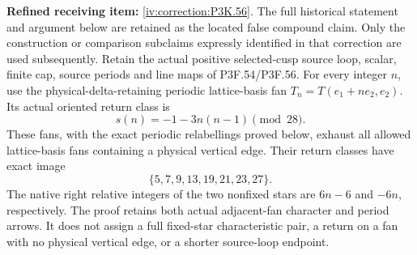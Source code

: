 \begin{theorem}\hypertarget{tag-02V2}{}\label{night:P3K.56}

\par\noindent\textbf{Refined receiving item:} \cref{iv:correction:P3K.56}. The full historical statement and argument below are retained as the located false compound claim. Only the construction or comparison subclaims expressly identified in that correction are used subsequently.
Retain the actual positive selected-cusp source loop, scalar, finite
cap, source periods and line maps of P3F.54/P3F.56. For every integer
\(n\), use the physical-delta-retaining periodic lattice-basis fan
\(T_n=T(e_1+ne_2,e_2)\). Its actual oriented return class is
\[
                  s(n)=-1-3n(n-1)\pmod{28}.
\]
These fans, with the exact periodic relabellings proved below,
exhaust all allowed lattice-basis fans containing a physical vertical
edge. Their return classes have exact image
\[
                     \{5,7,9,13,19,21,23,27\}.
\]
The native right relative integers of the two nonfixed stars are
\(6n-6\) and \(-6n\), respectively. The proof retains both actual
adjacent-fan character and period arrows. It does not assign a full
fixed-star characteristic pair, a return on a fan with no physical
vertical edge, or a shorter source-loop endpoint.
\end{theorem}

